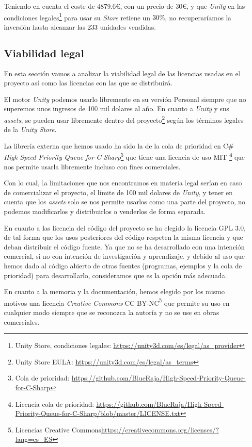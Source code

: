 Teniendo en cuenta el coste de 4879.6\euro, con un precio de 30\euro, y que \textit{Unity} en las condiciones legales\footnote{Unity Store, condiciones legales: \url{https://unity3d.com/es/legal/as_provider}} para usar su \textit{Store} retiene un $30\%$, no recuperaríamos la inversión hasta alcanzar las 233 unidades vendidas.

\subsection{Viabilidad legal}
En esta sección vamos a analizar la viabilidad legal de las licencias usadas en el proyecto así como las licencias con las que se distribuirá.

El motor \textit{Unity}\cite{unityweb} podemos usarlo libremente en su versión Personal siempre que no superemos unos ingresos de 100 mil dolares al año. En cuanto a \textit{Unity} y sus \textit{assets}, se pueden usar libremente dentro del proyecto\footnote{Unity Store EULA: \url{https://unity3d.com/es/legal/as_terms}} según los términos legales de la \textit{Unity Store}.

La librería externa que hemos usado ha sido la de la cola de prioridad en C\# \textit{High Speed Priority Queue for C Sharp}\footnote{Cola de prioridad: \url{https://github.com/BlueRaja/High-Speed-Priority-Queue-for-C-Sharp}}\cite{bluerajacola} que tiene una licencia de uso MIT \footnote{Licencia cola de prioridad: \url{https://github.com/BlueRaja/High-Speed-Priority-Queue-for-C-Sharp/blob/master/LICENSE.txt}} que nos permite usarla libremente incluso con fines comerciales.

Con lo cual, la limitaciones que nos encontramos en materia legal serían en caso de comercializar el proyecto, el límite de 100 mil dolares de \textit{Unity}, y tener en cuenta que los \textit{assets} solo se nos permite usarlos como una parte del proyecto, no podemos modificarlos y distribuirlos o venderlos de forma separada.

En cuanto a las licencia del código del proyecto se ha elegido la licencia GPL 3.0, de tal forma que los usos posteriores del código respeten la misma licencia y que deban distribuir el código fuente. Ya que no se ha desarrollado con una intención comercial, si no con intención de investigación y aprendizaje, y debido al uso que hemos dado al código abierto de otras fuentes (programas, ejemplos y la cola de prioridad) para desarrollarlo, consideramos que es la opción más adecuada.

En cuanto a la memoria y la documentación, hemos elegido por los mismo motivos una licencia \textit{Creative Commons} CC BY-NC\footnote{Licencias Creative Commons\url{https://creativecommons.org/licenses/?lang=es_ES}} que permite su uso en cualquier modo siempre que se reconozca la autoría y no se use en obras comerciales.